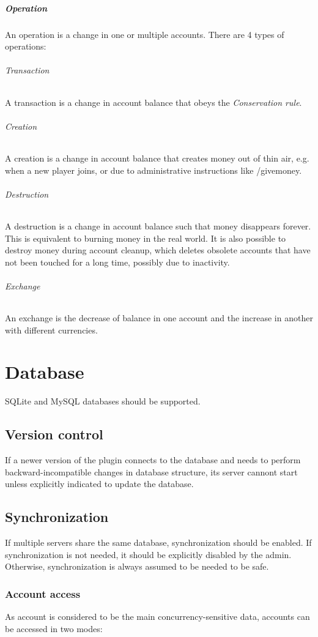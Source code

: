 \documentclass{report}
\begin{document}
			\paragraph{Operation}
				An operation is a change in one or multiple accounts.
				There are 4 types of operations:
				\subparagraph{Transaction} A transaction is a change in account balance that obeys the \textit{Conservation rule}.
				\subparagraph{Creation} A creation is a change in account balance that creates money out of thin air,
					e.g. when a new player joins, or due to administrative instructions like /givemoney.
				\subparagraph{Destruction} A destruction is a change in account balance such that money disappears forever.
					This is equivalent to burning money in the real world.
					It is also possible to destroy money during account cleanup, which
					deletes obsolete accounts that have not been touched for a long time, possibly due to inactivity.
				\subparagraph{Exchange} An exchange is the decrease of balance in one account and the increase in another with different currencies.

		\chapter{Database}
			SQLite and MySQL databases should be supported.

			\section{Version control}
				If a newer version of the plugin connects to the database and needs to perform backward-incompatible changes in database structure,
				its server cannont start unless explicitly indicated to update the database.

			\section{Synchronization}
				If multiple servers share the same database, synchronization should be enabled.
				If synchronization is not needed, it should be explicitly disabled by the admin.
				Otherwise, synchronization is always assumed to be needed to be safe.

				\subsection{Account access}
					As account is considered to be the main concurrency-sensitive data, accounts can be accessed in two modes:
\end{document}
